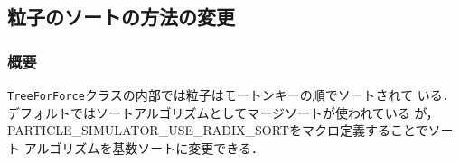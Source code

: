 \subsection{粒子のソートの方法の変更}
\subsubsection{概要}
{\tt TreeForForce}クラスの内部では粒子はモートンキーの順でソートされて
いる．デフォルトではソートアルゴリズムとしてマージソートが使われている
が，PARTICLE\_SIMULATOR\_USE\_RADIX\_SORTをマクロ定義することでソート
アルゴリズムを基数ソートに変更できる．





